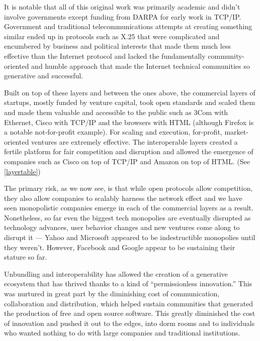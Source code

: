 It is notable that all of this original work was primarily academic and didn't involve governments except funding from \ac{DARPA} for early work in \ac{TCP/IP}. Government and traditional telecommunications attempts at creating something similar ended up in protocols such as \ac{X.25} that were complicated and encumbered by business and political interests that made them much less effective than the Internet protocol and lacked the fundamentally community-oriented and humble approach that made the Internet technical communities so generative and successful.

Built on top of these layers and between the ones above, the commercial layers of startups, mostly funded by venture capital, took open standards and scaled them and made them valuable and accessible to the public such as 3Com with Ethernet, Cisco with \ac{TCP/IP} and the browsers with \ac{HTML} (although Firefox is a notable not-for-profit example). For scaling and execution, for-profit, market-oriented ventures are extremely effective. The interoperable layers created a fertile platform for fair competition and disruption and allowed the emergence of companies such as Cisco on top of \ac{TCP/IP} and Amazon on top of \ac{HTML}. (See \autoref{layertable})

The primary risk, as we now see, is that while open protocols allow competition, they also allow companies to scalably harness the network effect \cite{web20} and we have seen monopolistic companies emerge in each of the commercial layers as a result. Nonetheless, so far even the biggest tech monopolies are eventually disrupted as technology advances, user behavior changes and new ventures come along to disrupt it --- Yahoo and Microsoft appeared to be indestructible monopolies until they weren't. However, Facebook and Google appear to be sustaining their stature so far.

Unbundling and interoperability has allowed the creation of a generative ecosystem that has thrived thanks to a kind of ``permissionless innovation.'' This was nurtured in great part by the diminishing cost of communication, collaboration and distribution, which helped sustain communities that generated the production of free and open source software. This greatly diminished the cost of innovation and pushed it out to the edges, into dorm rooms and to individuals who wanted nothing to do with large companies and traditional institutions.

